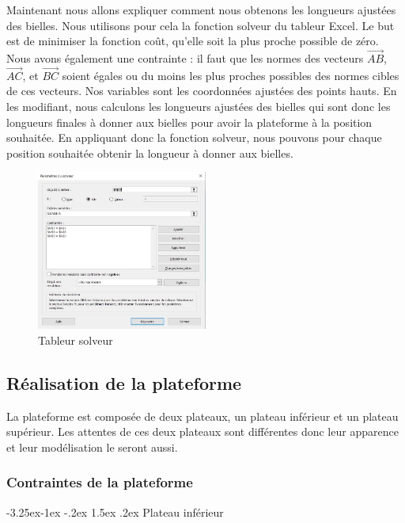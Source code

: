 \documentclass[a4paper,12pt]{article}
\makeatletter
\newcounter{subsubsubsection}[subsubsection]
\newcommand\subsubsubsection{\@startsection{subsubsubsection}{4}{\z@}%
                                     {-3.25ex\@plus -1ex \@minus -.2ex}%
                                     {1.5ex \@plus .2ex}%
                                     {\normalfont\small\bfseries}}
\makeatother
\begin{document}
Maintenant nous allons expliquer comment nous obtenons les longueurs ajustées des bielles. 
Nous utilisons pour cela la fonction solveur du tableur Excel. 
Le but est de minimiser la fonction coût, qu'elle soit la plus proche possible de zéro. 
Nous avons également une contrainte : il faut que les normes des vecteurs $\overrightarrow{AB}$, $\overrightarrow{AC}$, et $\overrightarrow{BC}$ soient égales ou du moins les plus proches possibles des normes cibles de ces vecteurs. 
Nos variables sont les coordonnées ajustées des points hauts. 
En les modifiant, nous calculons les longueurs ajustées des bielles qui sont donc les longueurs finales à donner aux bielles pour avoir la plateforme à la position souhaitée. 
En appliquant donc la fonction solveur, nous pouvons pour chaque position souhaitée obtenir la longueur à donner aux bielles.


\begin{figure}[H]
  \centering
  \includegraphics[width=0.5\textwidth]{tableur solveur.jpg}
  \caption{Tableur solveur}
\end{figure}

\subsection{Réalisation de la plateforme}
La plateforme est composée de deux plateaux, un plateau inférieur et un plateau supérieur. 
Les attentes de ces deux plateaux sont différentes donc leur apparence et leur modélisation le seront aussi.

\subsubsection{Contraintes de la plateforme}

\subsubsubsection{Plateau inférieur}
\end{document}
